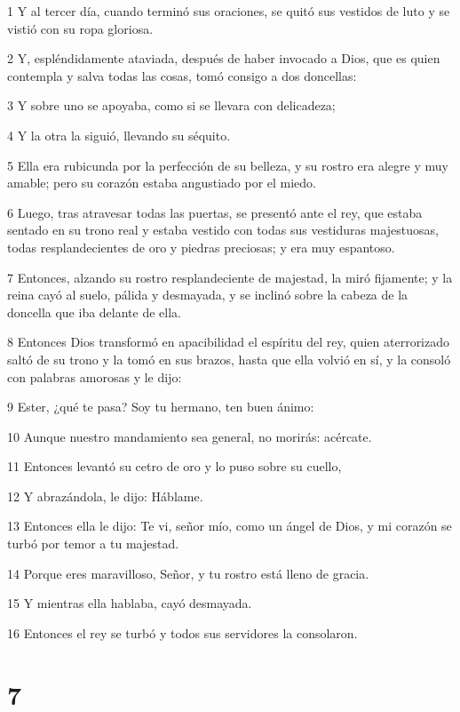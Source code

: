 \par 1 Y al tercer día, cuando terminó sus oraciones, se quitó sus vestidos de luto y se vistió con su ropa gloriosa.
\par 2 Y, espléndidamente ataviada, después de haber invocado a Dios, que es quien contempla y salva todas las cosas, tomó consigo a dos doncellas:
\par 3 Y sobre uno se apoyaba, como si se llevara con delicadeza;
\par 4 Y la otra la siguió, llevando su séquito.
\par 5 Ella era rubicunda por la perfección de su belleza, y su rostro era alegre y muy amable; pero su corazón estaba angustiado por el miedo.
\par 6 Luego, tras atravesar todas las puertas, se presentó ante el rey, que estaba sentado en su trono real y estaba vestido con todas sus vestiduras majestuosas, todas resplandecientes de oro y piedras preciosas; y era muy espantoso.
\par 7 Entonces, alzando su rostro resplandeciente de majestad, la miró fijamente; y la reina cayó al suelo, pálida y desmayada, y se inclinó sobre la cabeza de la doncella que iba delante de ella.
\par 8 Entonces Dios transformó en apacibilidad el espíritu del rey, quien aterrorizado saltó de su trono y la tomó en sus brazos, hasta que ella volvió en sí, y la consoló con palabras amorosas y le dijo:
\par 9 Ester, ¿qué te pasa? Soy tu hermano, ten buen ánimo:
\par 10 Aunque nuestro mandamiento sea general, no morirás: acércate.
\par 11 Entonces levantó su cetro de oro y lo puso sobre su cuello,
\par 12 Y abrazándola, le dijo: Háblame.
\par 13 Entonces ella le dijo: Te vi, señor mío, como un ángel de Dios, y mi corazón se turbó por temor a tu majestad.
\par 14 Porque eres maravilloso, Señor, y tu rostro está lleno de gracia.
\par 15 Y mientras ella hablaba, cayó desmayada.
\par 16 Entonces el rey se turbó y todos sus servidores la consolaron.

\chapter{7}

